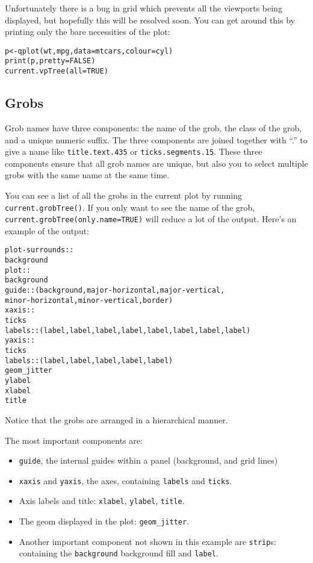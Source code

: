 \begin{sidebar}
  Unfortunately there is a bug in grid which prevents all the viewports being displayed, but hopefully this will be resolved soon.  You can get around this by printing only the bare necessities of the plot:

  \begin{alltt}
  p <- qplot(wt, mpg, data=mtcars, colour=cyl)
  print(p, pretty = FALSE)
  current.vpTree(all=TRUE)
  \end{alltt}  
\end{sidebar}


\subsection{Grobs}
\label{sub:grobs}

Grob names have three components: the name of the grob, the class of the grob, and a unique numeric suffix.  The three components are joined together with ``.'' to give a name like {\tt title.text.435} or {\tt ticks.segments.15}.  These three components ensure that all grob names are unique, but also you to select multiple grobs with the same name at the same time.

You can see a list of all the grobs in the current plot by running {\tt current.grobTree()}.  If you only want to see the name of the grob, {\tt current.grobTree(only.name=TRUE)} will reduce a lot of the output.  Here's an example of the output:

\begin{alltt}
plot-surrounds::
 background
 plot::
  background
  guide:: (background, major-horizontal, major-vertical, 
           minor-horizontal, minor-vertical, border)
  xaxis::
   ticks
   labels:: (label, label, label, label, label, label, label, label)
  yaxis::
   ticks
   labels:: (label, label, label, label, label)
  geom_jitter
 ylabel
 xlabel
 title
\end{alltt}

Notice that the grobs are arranged in a hierarchical manner. 

The most important components are:

\begin{itemize}
  \item {\tt guide}, the internal guides within a panel (background, and grid lines)

  \item {\tt xaxis} and {\tt yaxis}, the axes, containing {\tt labels} and {\tt ticks}.

	\item Axis labels and title: {\tt xlabel}, {\tt ylabel}, {\tt title}.

  \item The geom displayed in the plot: {\tt geom_jitter}.

	\item Another important component not shown in this example are {\tt strip}s: containing the {\tt background} background fill and {\tt label}.

\end{itemize}


